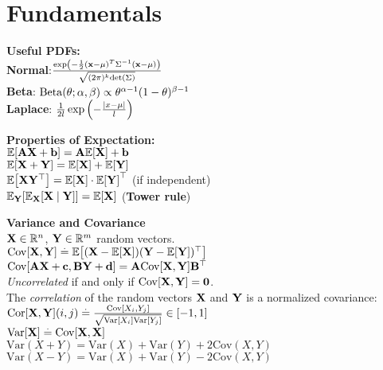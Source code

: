 \section{Fundamentals}
\begin{framed}
    \textbf{Useful PDFs:} \\
    \textbf{Normal}:$\frac{\exp \left(-\frac{1}{2}(\mathbf{x} - \mathbf{\mu})^T \Sigma^{-1} (\mathbf{x} - \mathbf{\mu}) \right)}{\sqrt{(2\pi)^k \mathrm{det}\left(\Sigma\right)}}$ \\
    \textbf{Beta}: $\Beta[\theta]{\alpha}{\beta} \propto \theta^{\alpha-1} (1-\theta)^{\beta-1}$ \\
    \textbf{Laplace}: $\frac{1}{2l}\exp\left(-\frac{\left| x - \mu \right|}{l}\right)$
\end{framed}
\begin{framed}
    \textbf{Properties of Expectation:}\\
    $\E{\mA \rX + \vb} = \mA \E{\rX} + \vb $\\ 
    $ \E{\rX + \rY} = \E{\rX} + \E{\rY}$ \\
    $\E{\rX\transpose{\rY}} = \E{\rX} \cdot \transpose{\E{\rY}}$ (if independent)\\
    $\E[\rY]{\E[\rX]{\rX \mid \rY}} = \E{\rX}$ (\textbf{Tower rule})
\end{framed} 
\begin{framed}
    \textbf{Variance and Covariance}\\
    $\mathbf{X} \in \mathbb{R}^n$, $\mathbf{Y} \in \mathbb{R}^m$ random vectors.\\
    $\Cov{\rX, \rY} \defeq \E{(\rX - \E{\rX})\transpose{(\rY - \E{\rY})}}$\\
    $\Cov{\mA \rX + \vc, \mB \rY + \vd} = \mA \Cov{\rX, \rY} \transpose{\mB}$\\
    \emph{Uncorrelated} if and only if $\Cov{\rX, \rY} = \mzero$.\\
    The \emph{correlation} of the random vectors $\mathbf{X}$ and $\mathbf{Y}$ is a normalized covariance: 
    $\Cor{\rX, \rY}(i,j) \defeq \frac{\Cov{X_i, Y_j}}{\sqrt{\Var{X_i} \Var{Y_j}}} \in [-1, 1]$\\
    $\Var{\rX} \defeq \Cov{\rX, \rX}$\\
    $\text{Var}(X+Y) = \text{Var}(X) + \text{Var}(Y) + 2\text{Cov}(X, Y)$\\
    $\text{Var}(X-Y) = \text{Var}(X) + \text{Var}(Y) - 2\text{Cov}(X, Y)$\\
\end{framed}

